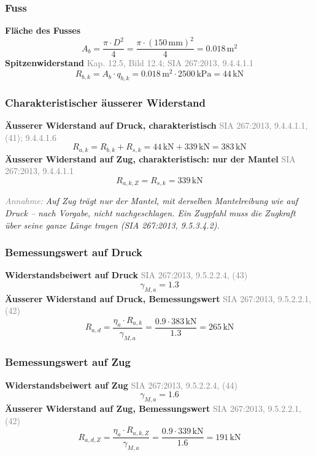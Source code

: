 \documentclass[11pt,a4paper]{article}
\newcommand{\normref}[1]{{\small\textcolor{gray}{#1}}}
\newcommand{\hinweis}[2]{\par\noindent\textcolor{gray}{\textit{#1:}} \textit{#2}\par}
\begin{document}
\subsubsection{Fuss}
\noindent\textbf{Fläche des Fusses}
\begin{equation*}
A_b = \frac{\pi \cdot D^{2}}{4} = \frac{\pi \cdot \left(150\,\mathrm{mm}\right)^{2}}{4} = 0.018\,\mathrm{m}^{2}
\end{equation*}
\noindent\textbf{Spitzenwiderstand} \hfill \normref{Kap. 12.5, Bild 12.4; SIA 267:2013, 9.4.4.1.1}
\begin{equation*}
R_{b,k} = A_b \cdot q_{b,k} = 0.018\,\mathrm{m}^{2} \cdot 2500\,\mathrm{kPa} = 44\,\mathrm{kN}
\end{equation*}
\subsubsection{Charakteristischer äusserer Widerstand}
\noindent\textbf{Äusserer Widerstand auf Druck, charakteristisch} \hfill \normref{SIA 267:2013, 9.4.4.1.1, (41); 9.4.4.1.6}
\begin{equation*}
R_{a,k} = R_{b,k} + R_{s,k} = 44\,\mathrm{kN} + 339\,\mathrm{kN} = 383\,\mathrm{kN}
\end{equation*}
\noindent\textbf{Äusserer Widerstand auf Zug, charakteristisch: nur der Mantel} \hfill \normref{SIA 267:2013, 9.4.4.1.1}
\begin{equation*}
R_{a,k,Z} = R_{s,k} = 339\,\mathrm{kN}
\end{equation*}
\hinweis{Annahme}{Auf Zug trägt nur der Mantel, mit derselben Mantelreibung wie auf Druck -- nach Vorgabe, nicht nachgeschlagen. Ein Zugpfahl muss die Zugkraft über seine ganze Länge tragen (SIA 267:2013, 9.5.3.4.2).}
\subsubsection{Bemessungswert auf Druck}
\noindent\textbf{Widerstandsbeiwert auf Druck} \hfill \normref{SIA 267:2013, 9.5.2.2.4, (43)}
\begin{equation*}
\gamma_{M,a} = 1.3
\end{equation*}
\noindent\textbf{Äusserer Widerstand auf Druck, Bemessungswert} \hfill \normref{SIA 267:2013, 9.5.2.2.1, (42)}
\begin{equation*}
R_{a,d} = \frac{\eta_a \cdot R_{a,k}}{\gamma_{M,a}} = \frac{0.9 \cdot 383\,\mathrm{kN}}{1.3} = 265\,\mathrm{kN}
\end{equation*}
\subsubsection{Bemessungswert auf Zug}
\noindent\textbf{Widerstandsbeiwert auf Zug} \hfill \normref{SIA 267:2013, 9.5.2.2.4, (44)}
\begin{equation*}
\gamma_{M,a} = 1.6
\end{equation*}
\noindent\textbf{Äusserer Widerstand auf Zug, Bemessungswert} \hfill \normref{SIA 267:2013, 9.5.2.2.1, (42)}
\begin{equation*}
R_{a,d,Z} = \frac{\eta_a \cdot R_{a,k,Z}}{\gamma_{M,a}} = \frac{0.9 \cdot 339\,\mathrm{kN}}{1.6} = 191\,\mathrm{kN}
\end{equation*}
\end{document}
